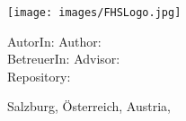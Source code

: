 \begin{titlepage}
\else %

    \begin{center}
    
    \texttt{[image: images/FHSLogo.jpg]}


    \vspace*{4cm}
    
    \fontsize{20.79}{18pt}{\selectfont        
    	\textit{\textbf{\titlename}}
    }
    
    \vspace*{4cm}
    
    \fontsize{20.79}{18pt}{%
    \ifmmtlanguagegerman
      \textbf{ \ifmmtpaper Seminararbeit \else Bachelorarbeit \fi }
    \else
        \textbf{ \ifmmtpaper Seminar Paper \else Bachelor Thesis \fi }
    \fi
    }
    
    
    \end{center}
    
    \vfill
    
    \ifmmtlanguagegerman AutorIn: \else Author: \fi  \authorname  \\
    \ifmmtlanguagegerman BetreuerIn: \else Advisor: \fi \advisor \\
    Repository: \thesisrepo \\
    
    Salzburg, \ifmmtlanguagegerman Österreich, \else Austria, \fi \thesisdate
    
    
    

\fi

\end{titlepage}
